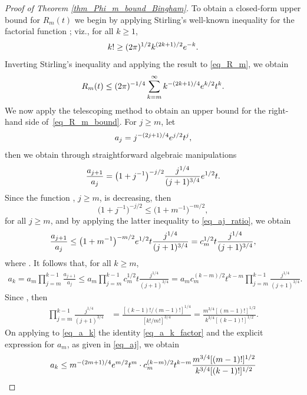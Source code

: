 \documentclass[11pt]{article}
\numberwithin{equation}{section}
\numberwithin{equation}{section}
\begin{document}
\begin{proof}[Proof of Theorem \ref{thm_Phi_m_bound_Bingham}]
To obtain a closed-form upper bound for $R_m(t)$ we begin by applying Stirling's well-known inequality for the factorial function \cite[Theorem 1]{Impens}; viz., for all $k \ge 1$,
\[
k! \ge (2\pi)^{1/2} k^{(2k+1)/2} {\rm e}^{-k}.
\]
Inverting Stirling's inequality and applying the result to \eqref{eq_R_m}, we obtain
\begin{equation}
\label{eq_R_m_bound}
R_m(t) \le (2\pi)^{-1/4} \sum_{k=m}^\infty k^{-(2k+1)/4} {\rm e}^{k/2} t^k.
\end{equation}
We now apply the telescoping method to obtain an upper bound for the right-hand side of~\eqref{eq_R_m_bound}. For $j \ge m$, let
\begin{equation}
\label{eq_aj}
a_j = j^{-(2j+1)/4} {\rm e}^{j/2} t^j,
\end{equation}
then we obtain through straightforward algebraic manipulations
\begin{equation}
\label{eq_aj_ratio}
\frac{a_{j+1}}{a_j} = \bigl(1+j^{-1}\bigr)^{-j/2} \frac{j^{1/4}}{(j+1)^{3/4}} {\rm e}^{1/2} t.
\end{equation}
Since the function , $j \ge m$, is decreasing, then
\begin{equation}
\label{eq_c_m}
\bigl(1+j^{-1}\bigr)^{-j/2} \le \bigl(1+m^{-1}\bigr)^{-m/2},
\end{equation}
for all $j \ge m$, and by applying the latter inequality to \eqref{eq_aj_ratio}, we obtain
\[
\frac{a_{j+1}}{a_j} \le \bigl(1+m^{-1}\bigr)^{-m/2} {\rm e}^{1/2} t \frac{j^{1/4}}{(j+1)^{3/4}}
= c_m^{1/2} t \frac{j^{1/4}}{(j+1)^{3/4}},
\]
where . It follows that, for all $k \ge m$,
\begin{align}
\label{eq_a_k}
a_k = a_m \prod_{j=m}^{k-1} \frac{a_{j+1}}{a_j}
\le a_m \prod_{j=m}^{k-1} c_m^{1/2} t \frac{j^{1/4}}{(j+1)^{3/4}}= a_m c_m^{(k-m)/2} t^{k-m} \prod_{j=m}^{k-1} \frac{j^{1/4}}{(j+1)^{3/4}}.
\end{align}
Since , then
\begin{align}
\label{eq_a_k_factor}
\prod_{j=m}^{k-1} \frac{j^{1/4}}{(j+1)^{3/4}} &= \frac{[(k-1)!/(m-1)!]^{1/4}}{[k!/m!]^{3/4}}
= \frac{m^{3/4} [(m-1)!]^{1/2}}{k^{3/4} [(k-1)!]^{1/2}}.
\end{align}
On applying to \eqref{eq_a_k} the identity \eqref{eq_a_k_factor} and the explicit expression for $a_m$, as given in \eqref{eq_aj}, we obtain
\begin{align}
\label{eq_a_k_bound}
a_k &\le m^{-(2m+1)/4} {\rm e}^{m/2} t^m \cdot c_m^{(k-m)/2} t^{k-m} \frac{m^{3/4} [(m-1)!]^{1/2}}{k^{3/4} [(k-1)!]^{1/2}} \nonumber \\

\end{align}
\end{proof}
\end{document}
